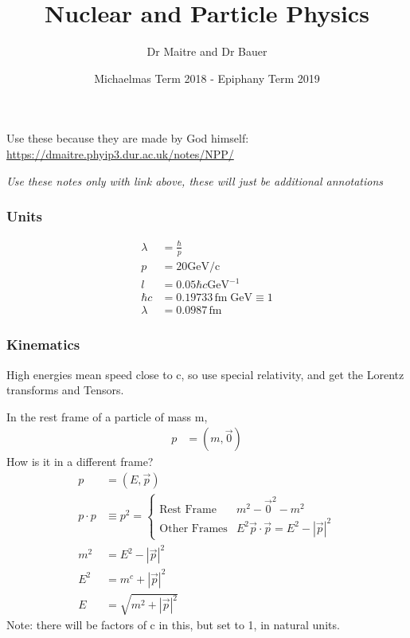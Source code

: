 \documentclass[a4paper, 11pt, normalem]{report}
\title{Nuclear and Particle Physics \vspace{-20pt}}
\author{Dr Maitre and Dr Bauer}
\date{\vspace{-15pt}Michaelmas Term 2018 - Epiphany Term 2019}
\begin{document}
\maketitle
\tableofcontents

\part{}
\chapter{}

Use these because they are made by God himself:
\url{https://dmaitre.phyip3.dur.ac.uk/notes/NPP/}

\emph{Use these notes only with link above, these will just be additional annotations}

\section{Units}

\begin{example}
    \begin{align}
        \lambda &= \frac{\hbar}{p} \\
        p &= 20 \text{GeV/c} \\
        l &= 0.05 \hbar c\text{GeV}^{-1} \\
        \hbar c &= 0.19733 \,\text{fm}\;\text{GeV} \equiv 1 \\
        \lambda &= 0.0987 \,\text{fm}
    \end{align}
\end{example}

\section{Kinematics}

High energies mean speed close to c, so use special relativity, and get the Lorentz transforms and Tensors.

\begin{example}[4-Momenta]
    In the rest frame of a particle of mass m, 
    \begin{align}
        p &= (m, \vec{0})
    \end{align}
    How is it in a different frame?
    \begin{align}
        p &= (E,\vec{p}) \\
        p\cdot p &\equiv p^2 = \begin{cases} \text{Rest Frame} & m^2 - \vec{0}^2 - m^2 \\ \text{Other Frames} & E^2 \vec{p}\cdot\vec{p} = E^2 - |\vec{p}|^2 \end{cases} \\
        m^2 &= E^2 - |\vec{p}|^2 \\
        E^2 &= m^c + |\vec{p}|^2 \\
        E &= \sqrt{m^2 + |\vec{p}|^2}
    \end{align}
    Note: there will be factors of c in this, but set to 1, in natural units.
\end{example}
\end{document}
